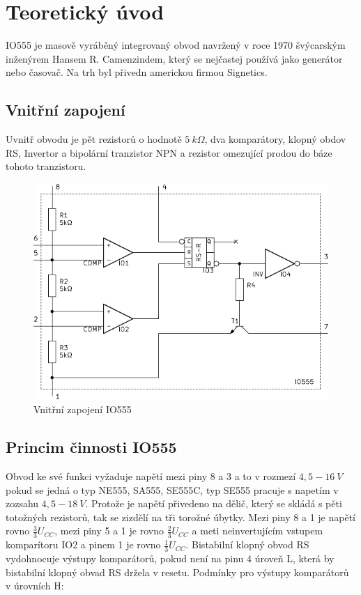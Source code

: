 \section{Teoretický úvod}
  \indent\indent
  IO555 je masově vyráběný integrovaný obvod navržený v roce 1970 švýcarským inženýrem Hansem R. Camenzindem, který se nejčastej používá jako generátor nebo časovač. Na trh byl přivedn americkou firmou Signetics.
  
  \subsection{Vnitřní zapojení}
    \indent\indent
    Uvnitř obvodu je pět rezistorů o hodnotě $5~k\Omega$, dva komparátory, klopný obdov RS, Invertor a bipolární tranzistor NPN a rezistor omezující prodou do báze tohoto tranzistoru.
    
    \begin{figure}[H]
    \centering
    \includegraphics[width=15cm]{../img/sch1.pdf}
    \caption{Vnitřní zapojení IO555}
    \label{sch:1}
  \end{figure}
    
  \subsection{Princim činnosti IO555}
    \indent\indent
    Obvod ke své funkci vyžaduje napětí mezi piny 8 a 3 a to v rozmezí $4,5-16~V$ pokud se jedná o typ NE555, SA555, SE555C, typ SE555 pracuje s napetím v zozsahu $4,5-18~V$. Protože je napětí přivedeno na dělič, který se skládá s pěti totožných rezistorů, tak se zizdělí na tři torožné úbytky. Mezi piny 8 a 1 je napětí rovno $\frac{3}{3}U_{CC}$, mezi piny 5 a 1 je rovno $\frac{2}{3}U_{CC}$ a meti neinvertujícím vstupem komparítoru IO2 a pinem 1 je rovno $\frac{1}{3}U_{CC}$. Bistabilní klopný obvod RS vydohnocuje výstupy komparátorů, pokud není na pinu 4 úroveň L, která by bistabilní klopný obvad RS držela v resetu. Podmínky pro výstupy komparátorů v úrovních H:
    
